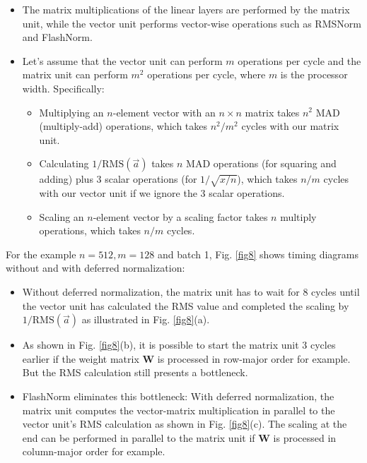 \documentclass{article}
\numberwithin{equation}{section} %
\newcommand{\mat}[1]{\mathbf{#1}}     %
\def\rms{\text{RMS}(\vec{a})}         %
\begin{document}
\begin{itemize}[topsep=-1pt, itemsep=-1pt]
  \item The matrix multiplications of the linear layers are performed by the matrix unit, while the vector unit performs vector-wise operations such as RMSNorm and FlashNorm.
  \item Let’s assume that the vector unit can perform $m$ operations per cycle and the matrix unit can perform $m^2$ operations per cycle, where $m$ is the processor width. Specifically:
  \begin{itemize}[topsep=-1pt, itemsep=-1pt]
    \item Multiplying an $n$-element vector with an $n \times n$ matrix takes $n^2$ MAD (multiply-add) operations, which takes $n^2/m^2$ cycles with our matrix unit.
    \item Calculating $1/\rms$ takes $n$ MAD operations (for squaring and adding) plus 3 scalar operations (for $1 / \sqrt{x/n}$), which takes $n/m$ cycles with our vector unit if we ignore the 3 scalar operations.
    \item Scaling an $n$-element vector by a scaling factor takes $n$ multiply operations, which takes $n/m$ cycles.
  \end{itemize}
\end{itemize}

For the example $n = 512, m = 128$ and batch 1, Fig. \ref{fig8} shows timing diagrams without and with deferred normalization:
\begin{itemize}[topsep=-1pt, itemsep=-1pt]
  \item Without deferred normalization, the matrix unit has to wait for 8 cycles until the vector unit has calculated the RMS value and completed the scaling by $1/ \rms$ as illustrated in Fig. \ref{fig8}(a).
  \item As shown in Fig. \ref{fig8}(b), it is possible to start the matrix unit 3 cycles earlier if the weight matrix $\mat{W}$ is processed in row-major order for example. But the RMS calculation still presents a bottleneck.
  \item FlashNorm eliminates this bottleneck: With deferred normalization, the matrix unit computes the vector-matrix multiplication in parallel to the vector unit's RMS calculation as shown in Fig. \ref{fig8}(c). The scaling at the end can be performed in parallel to the matrix unit if $\mat{W}$ is processed in column-major order for example.
\end{itemize}
\end{document}
